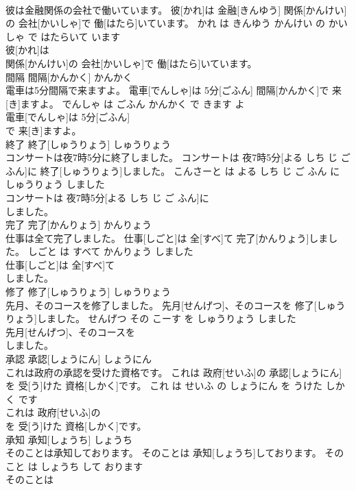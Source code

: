 \documentclass[8pt]{extreport}
\begin{document}
\begin{CJK}{UTF8}{min}
\\	彼は金融関係の会社で働いています。	彼[かれ]は 金融[きんゆう] 関係[かんけい]の 会社[かいしゃ]で 働[はたら]いています。	かれ は きんゆう かんけい の かいしゃ で はたらいて います	
\\	彼[かれ]は
\\	関係[かんけい]の 会社[かいしゃ]で 働[はたら]いています。			
\\	間隔	間隔[かんかく]	かんかく	
\\	電車は5分間隔で来ますよ。	電車[でんしゃ]は 5分[ごふん] 間隔[かんかく]で 来[き]ますよ。	でんしゃ は ごふん かんかく で きます よ	
\\	電車[でんしゃ]は 5分[ごふん]
\\	で 来[き]ますよ。			
\\	終了	終了[しゅうりょう]	しゅうりょう	
\\	コンサートは夜7時5分に終了しました。	コンサートは 夜7時5分[よる しち じ ご ふん]に 終了[しゅうりょう]しました。	こんさーと は よる しち じ ご ふん に しゅうりょう しました	
\\	コンサートは 夜7時5分[よる しち じ ご ふん]に
\\	しました。			
\\	完了	完了[かんりょう]	かんりょう	
\\	仕事は全て完了しました。	仕事[しごと]は 全[すべ]て 完了[かんりょう]しました。	しごと は すべて かんりょう しました	
\\	仕事[しごと]は 全[すべ]て
\\	しました。			
\\	修了	修了[しゅうりょう]	しゅうりょう	
\\	先月、そのコースを修了しました。	先月[せんげつ]、そのコースを 修了[しゅうりょう]しました。	せんげつ その こーす を しゅうりょう しました	
\\	先月[せんげつ]、そのコースを
\\	しました。			
\\	承認	承認[しょうにん]	しょうにん	
\\	これは政府の承認を受けた資格です。	これは 政府[せいふ]の 承認[しょうにん]を 受[う]けた 資格[しかく]です。	これ は せいふ の しょうにん を うけた しかく です	
\\	これは 政府[せいふ]の
\\	を 受[う]けた 資格[しかく]です。			
\\	承知	承知[しょうち]	しょうち	
\\	そのことは承知しております。	そのことは 承知[しょうち]しております。	その こと は しょうち して おります	
\\	そのことは

\end{CJK}
\end{document}
